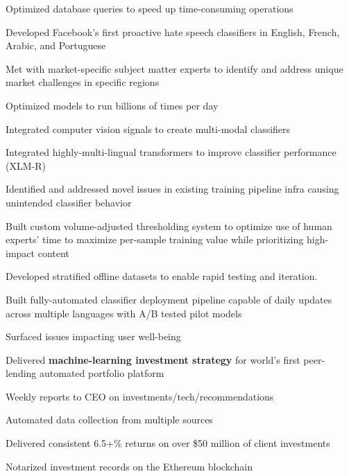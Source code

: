 \documentclass[]{resume}
\begin{document}
\begin{minipage}[t]{1.0\textwidth}
\begin{tightemize}
    \columnbreak

    \item Optimized database queries to speed up time-consuming operations
    
\end{tightemize}

\begin{tightemize}
\item Developed Facebook's first proactive hate speech classifiers in English, French, Arabic, and Portuguese
\item Met with market-specific subject matter experts to identify and address unique market challenges in specific regions
\item Optimized models to run billions of times per day
\item Integrated computer vision signals to create multi-modal classifiers
\item Integrated highly-multi-lingual transformers to improve classifier performance (XLM-R)
\item Identified and addressed novel issues in existing training pipeline infra causing unintended classifier behavior

\columnbreak

\item Built custom volume-adjusted thresholding system to optimize use of human experts' time to maximize per-sample training value while prioritizing high-impact content
\item Developed stratified offline datasets to enable rapid testing and iteration.
\item Built fully-automated classifier deployment pipeline capable of daily updates 
across multiple languages with A/B tested pilot models
\item Surfaced issues impacting user well-being
\end{tightemize}

\sectionsep

\begin{tightemize}
\item Delivered \textbf{machine-learning investment strategy} for world's first peer-lending automated portfolio platform
\item Weekly reports to CEO on investments/tech/recommendations
\item Automated data collection from multiple sources
\item Delivered consistent  6.5+\% returns on over \$50 million of client investments
\item Notarized investment records on the Ethereum blockchain
\end{tightemize}
\sectionsep


\end{minipage}
\end{document}
